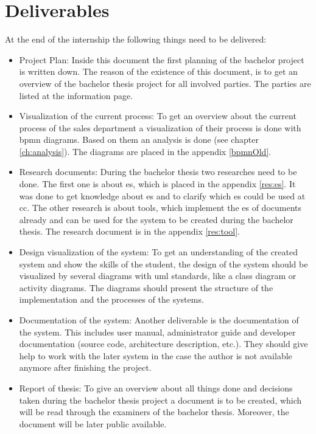\section{Deliverables}
At the end of the internship the following things need to be delivered:
\begin{itemize}
	\item Project Plan: Inside this document the first planning of the bachelor project is written down. The reason of the existence of this document, is to get an overview of the bachelor thesis project for all involved parties. The parties are listed at the information page.
	\item Visualization of the current process: To get an overview about the current process of the sales department a visualization of their process is done with \gls{bpmn} diagrams. Based on them an analysis is done (see chapter \ref{ch:analysis}). The diagrams are placed in the appendix \ref{bpmnOld}.
	\item Research documents: During the bachelor thesis two researches need to be done. The first one is about \gls{es}, which is placed in the appendix \ref{res:es}. It was done to get knowledge about \gls{es} and to clarify which \gls{es} could be used at \gls{cc}. The other research is about tools, which implement the \gls{es} of documents already and can be used for the system to be created during the bachelor thesis. The research document is in the appendix \ref{res:tool}.
	\item Design visualization of the system: To get an understanding of the created system and show the skills of the student, the design of the system should be visualized by several diagrams with \gls{uml} standards, like a class diagram or activity diagrams. The diagrams should present the structure of the implementation and the processes of the systems.
	\item Documentation of the system: Another deliverable is the documentation of the system. This includes user manual, administrator guide and developer documentation (source code, architecture description, etc.). They should give help to work with the later system in the case the author is not available anymore after finishing the project.
	\item Report of thesis: To give an overview about all things done and decisions taken during the bachelor thesis project a document is to be created, which will be read through the examiners of the bachelor thesis. Moreover, the document will be later public available.   
\end{itemize}

